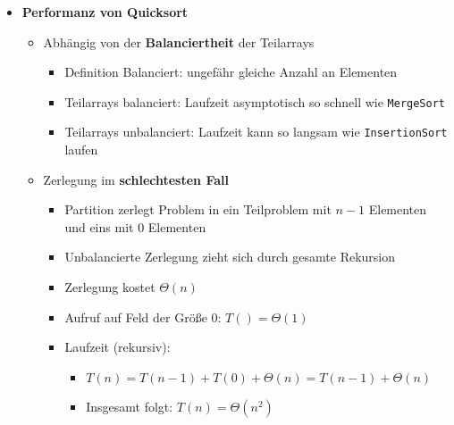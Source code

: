 \begin{itemize}
        \item \textbf{Performanz von Quicksort}
            \begin{itemize}
                \item Abhängig von der \textbf{Balanciertheit} der Teilarrays 
                    \begin{itemize}
                        \item Definition Balanciert: ungefähr gleiche Anzahl an Elementen
                        \item Teilarrays balanciert: Laufzeit asymptotisch so schnell wie \texttt{MergeSort}
                        \item Teilarrays unbalanciert: Laufzeit kann so langsam wie \texttt{InsertionSort} laufen
                    \end{itemize}

                \item Zerlegung im \textbf{schlechtesten Fall}
                    \begin{itemize}
                        \item Partition zerlegt Problem in ein Teilproblem mit $n-1$ Elementen und eins mit $0$ Elementen
                        \item Unbalancierte Zerlegung zieht sich durch gesamte Rekursion
                        \item Zerlegung kostet $\Theta(n)$
                        \item Aufruf auf Feld der Größe 0: $T() = \Theta(1)$
                        \item Laufzeit (rekursiv):
                            \begin{itemize}
                                \item $T(n) = T(n-1) + T(0) + \Theta(n) = T(n-1) + \Theta(n)$
                                \item Insgesamt folgt: $T(n) = \Theta(n^2)$
                            \end{itemize}
                    \end{itemize}


\end{itemize}
\end{itemize}
